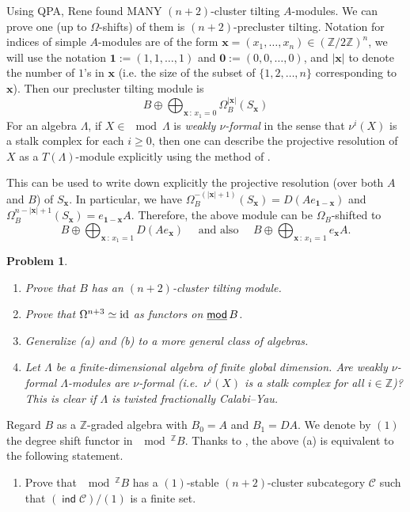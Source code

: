 \documentclass[a4paper,reqno,11pt]{amsart}
\newtheorem{problem}[theorem]{Problem}
\theoremstyle{definition}
\newcommand{\CC}{\mathcal{C}}
\newcommand{\Z}{\mathbb{Z}}
\DeclareMathOperator{\ind}{\mathsf{ind}}
\newcommand{\stmod}{\mathop{\underline{\mod}}\nolimits}
\numberwithin{equation}{section}
\begin{document}
Using QPA, Rene found MANY $(n+2)$-cluster tilting $A$-modules.  We can prove one (up to $\Omega$-shifts) of them is $(n+2)$-precluster tilting.  Notation for indices of simple $A$-modules are of the form $\pmb{x}=(x_1, \ldots, x_n)\in (\Z/2\Z)^n$, we will use the notation $\pmb{1}:=(1,1,\ldots, 1)$ and $\pmb{0}:=(0,0,\ldots, 0)$, and $|\pmb{x}|$ to denote the number of $1$'s in $\pmb{x}$ (i.e. the size of the subset of $\{1,2,\ldots, n\}$ corresponding to $\pmb{x}$).  Then our precluster tilting module is
\[
 B\oplus \bigoplus_{\pmb{x}\,:\, x_1=0} \Omega_B^{|\pmb{x}|}(S_{\pmb{x}})
\]
For an algebra $\Lambda$, if $X\in\mod\Lambda$ is \emph{weakly $\nu$-formal} in the sense that $\nu^i(X)$ is a stalk complex for each $i\ge0$, then one can describe the projective resolution of $X$ as a $T(\Lambda)$-module explicitly using the method of \cite{CIM}.

This can be used to write down explicitly the projective resolution (over both $A$ and $B$) of $S_{\pmb{x}}$.  In particular, we have $\Omega_B^{-(|\pmb{x}|+1)}(S_{\pmb{x}}) = D(Ae_{\pmb{1}-\pmb{x}})$ and $\Omega_B^{n-|\pmb{x}|+1}(S_{\pmb{x}}) = e_{\pmb{1}-\pmb{x}}A$.  Therefore, the above module can be $\Omega_B$-shifted to
\[
 B\oplus \bigoplus_{\pmb{x}\,:\,x_1=1} D(Ae_{\pmb{x}}) \quad\text{ and also } \quad  B\oplus \bigoplus_{\pmb{x}\,:\,x_1=1} e_{\pmb{x}}A.
\]

\begin{problem}\label{main problem}
\begin{enumerate}[\rm(a)]
\item Prove that $B$ has an $(n+2)$-cluster tilting module.
\item Prove that $\Omega^{n+3}\simeq{\rm id}$ as functors on $\stmod B$.
\item Generalize (a) and (b) to a more general class of algebras.
\item Let $\Lambda$ be a finite-dimensional algebra of finite global dimension. Are weakly $\nu$-formal $\Lambda$-modules are $\nu$-formal (i.e.\ $\nu^i(X)$ is a stalk complex for all $i\in\Z$)? This is clear if $\Lambda$ is twisted fractionally Calabi--Yau.
\end{enumerate}
\end{problem}

Regard $B$ as a $\Z$-graded algebra with $B_0=A$ and $B_1=DA$. We denote by $(1)$ the degree shift functor in $\mod^{\Z}B$.
Thanks to \cite[2.14(a)]{DI}, the above (a) is equivalent to the following statement.
\begin{enumerate}[\rm(a)]
\item[\rm(a')] Prove that $\mod^{\Z}B$ has a $(1)$-stable $(n+2)$-cluster subcategory $\CC$  such that $(\ind\CC)/(1)$ is a finite set.
\end{enumerate}
\fi
\end{document}
